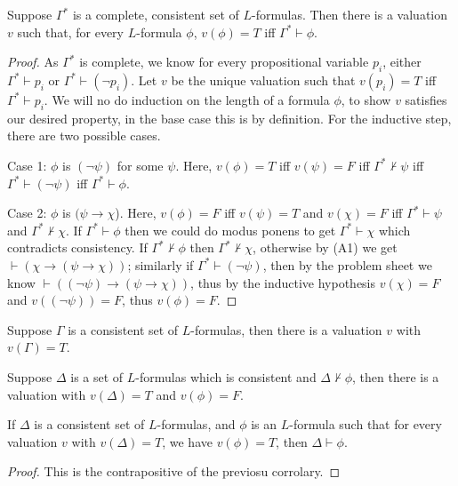 \documentclass{article}
\begin{document}
\begin{lemma}
    Suppose $\Gamma^*$ is a complete, consistent set of $L$-formulas. Then there is a valuation $v$ such that, for every $L$-formula $\phi$, $v(\phi)=T$ iff $\Gamma^*\vdash\phi$.
    \begin{proof}
        As $\Gamma^*$ is complete, we know for every propositional variable $p_i$, either $\Gamma^*\vdash p_i$ or $\Gamma^*\vdash(\neg p_i)$. Let $v$ be the unique valuation such that $v(p_i)=T$ iff $\Gamma^*\vdash p_i$. We will no do induction on the length of a formula $\phi$, to show $v$ satisfies our desired property, in the base case this is by definition. For the inductive step, there are two possible cases.

        Case 1: $\phi$ is $(\neg\psi)$ for some $\psi$. Here, $v(\phi)=T$ iff $v(\psi)=F$ iff $\Gamma^*\not\vdash\psi$ iff $\Gamma^*\vdash(\neg\psi)$ iff $\Gamma^*\vdash\phi$.

        Case 2: $\phi$ is $(\psi\rightarrow\chi$). Here, $v(\phi)=F$ iff $v(\psi)=T$ and $v(\chi)=F$ iff $\Gamma^*\vdash\psi$ and $\Gamma^*\not\vdash\chi$. If $\Gamma^*\vdash\phi$ then we could do modus ponens to get $\Gamma^*\vdash\chi$ which contradicts consistency. If $\Gamma^*\not\vdash\phi$ then $\Gamma^*\not\vdash\chi$, otherwise by (A1) we get $\vdash(\chi\rightarrow(\psi\rightarrow\chi))$; similarly if $\Gamma^*\vdash(\neg\psi)$, then by the problem sheet we know $\vdash((\neg\psi)\rightarrow(\psi\rightarrow\chi))$, thus by the inductive hypothesis $v(\chi)=F$ and $v((\neg\psi))=F$, thus $v(\phi)=F$.
    \end{proof}
\end{lemma}

\begin{corollary}
    Suppose $\Gamma$ is a consistent set of $L$-formulas, then there is a valuation $v$ with $v(\Gamma)=T$.
\end{corollary}

\begin{corollary}
    Suppose $\Delta$ is a set of $L$-formulas which is consistent and $\Delta\not\vdash\phi$, then there is a valuation with $v(\Delta)=T$ and $v(\phi)=F$.
\end{corollary}

\begin{theorem}
    If $\Delta$ is a consistent set of $L$-formulas, and $\phi$ is an $L$-formula such that for every valuation $v$ with $v(\Delta)=T$, we have $v(\phi)=T$, then $\Delta\vdash\phi$.
    \begin{proof}
        This is the contrapositive of the previosu corrolary.
    \end{proof}
\end{theorem}
\end{document}
